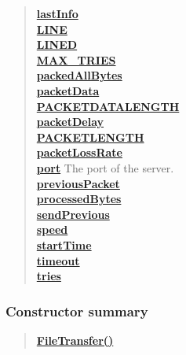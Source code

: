 {{{{{\begin{verse}
\hyperlink{filetransferUDP.FileTransfer.lastInfo}{{\bf lastInfo}} \\
\hyperlink{filetransferUDP.FileTransfer.LINE}{{\bf LINE}} \\
\hyperlink{filetransferUDP.FileTransfer.LINED}{{\bf LINED}} \\
\hyperlink{filetransferUDP.FileTransfer.MAX_TRIES}{{\bf MAX\_TRIES}} \\
\hyperlink{filetransferUDP.FileTransfer.packedAllBytes}{{\bf packedAllBytes}} \\
\hyperlink{filetransferUDP.FileTransfer.packetData}{{\bf packetData}} \\
\hyperlink{filetransferUDP.FileTransfer.PACKETDATALENGTH}{{\bf PACKETDATALENGTH}} \\
\hyperlink{filetransferUDP.FileTransfer.packetDelay}{{\bf packetDelay}} \\
\hyperlink{filetransferUDP.FileTransfer.PACKETLENGTH}{{\bf PACKETLENGTH}} \\
\hyperlink{filetransferUDP.FileTransfer.packetLossRate}{{\bf packetLossRate}} \\
\hyperlink{filetransferUDP.FileTransfer.port}{{\bf port}} The port of the server.\\
\hyperlink{filetransferUDP.FileTransfer.previousPacket}{{\bf previousPacket}} \\
\hyperlink{filetransferUDP.FileTransfer.processedBytes}{{\bf processedBytes}} \\
\hyperlink{filetransferUDP.FileTransfer.sendPrevious}{{\bf sendPrevious}} \\
\hyperlink{filetransferUDP.FileTransfer.speed}{{\bf speed}} \\
\hyperlink{filetransferUDP.FileTransfer.startTime}{{\bf startTime}} \\
\hyperlink{filetransferUDP.FileTransfer.timeout}{{\bf timeout}} \\
\hyperlink{filetransferUDP.FileTransfer.tries}{{\bf tries}} \\
\end{verse}
}
\subsubsection{Constructor summary}{
\begin{verse}
\hyperlink{filetransferUDP.FileTransfer()}{{\bf FileTransfer()}} \\
\end{verse}
}
}}}}
